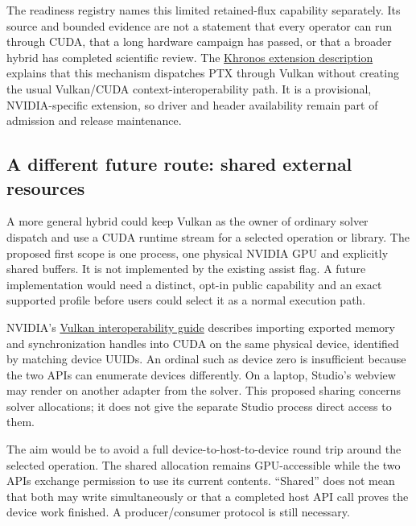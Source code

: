 The readiness registry names this limited retained-flux capability separately.
Its source and bounded evidence are not a statement that every operator can run
through CUDA, that a long hardware campaign has passed, or that a broader hybrid
has completed scientific review. The
\href{https://docs.vulkan.org/refpages/latest/refpages/source/VK_NV_cuda_kernel_launch.html}{Khronos extension description}
explains that this mechanism dispatches PTX through Vulkan without creating the
usual Vulkan/CUDA context-interoperability path. It is a provisional,
NVIDIA-specific extension, so driver and header availability remain part of
admission and release maintenance.

\subsection{A different future route: shared external resources}
A more general hybrid could keep Vulkan as the owner of ordinary solver
dispatch and use a CUDA runtime stream for a selected operation or library.
The proposed first scope is one process, one physical NVIDIA GPU and explicitly
shared buffers. It is not implemented by the existing assist flag. A future
implementation would need a distinct, opt-in public capability and an exact
supported profile before users could select it as a normal execution path.

NVIDIA's
\href{https://docs.nvidia.com/cuda/cuda-programming-guide/04-special-topics/graphics-interop.html}{Vulkan interoperability guide}
describes importing exported memory and synchronization handles into CUDA on
the same physical device, identified by matching device UUIDs. An ordinal such
as device zero is insufficient because the two APIs can enumerate devices
differently. On a laptop, Studio's webview may render on another adapter from
the solver. This proposed sharing concerns solver allocations; it does not give
the separate Studio process direct access to them.

The aim would be to avoid a full device-to-host-to-device round trip around the
selected operation. The shared allocation remains GPU-accessible while the two
APIs exchange permission to use its current contents. ``Shared'' does not mean
that both may write simultaneously or that a completed host API call proves
the device work finished. A producer/consumer protocol is still necessary.



